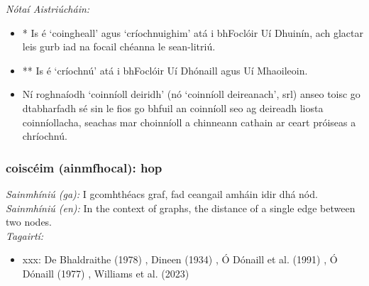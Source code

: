 \documentclass{article}
\begin{document}
 \noindent \textit{Nótaí Aistriúcháin:}
\begin{itemize}
	\item * Is é `coingheall' agus `críochnuighim' atá i bhFoclóir Uí Dhuinín, ach glactar leis gurb iad na focail chéanna le sean-litriú.
	\item ** Is é `críochnú' atá i bhFoclóir Uí Dhónaill agus Uí Mhaoileoin.
	\item Ní roghnaíodh `coinníoll deiridh' (nó `coinníoll deireanach', srl) anseo toisc go dtabharfadh sé sin le fios go bhfuil an coinníoll seo ag deireadh liosta coinníollacha, seachas mar choinníoll a chinneann cathain ar ceart próiseas a chríochnú.
\end{itemize}


\subsubsection*{coiscéim (ainmfhocal): hop}
 \noindent \textit{Sainmhíniú (ga):} I gcomhthéacs graf, fad ceangail amháin idir dhá nód.
\\
 \noindent \textit{Sainmhíniú (en):} In the context of graphs, the distance of a single edge between two nodes.
\\
 \noindent \textit{Tagairtí:}
\begin{itemize}
	\item xxx: De Bhaldraithe (1978) \cite{de-bhaldraithe}, Dineen (1934) \cite{dineen}, Ó Dónaill et al. (1991) \cite{focloir-beag}, Ó Dónaill (1977) \cite{odonaill}, Williams et al. (2023) \cite{storchiste}
\end{itemize}
\end{document}
